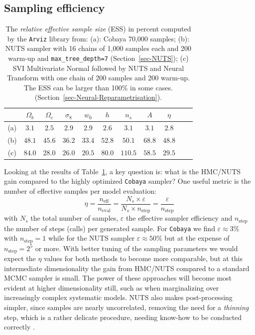 \documentclass[twocolumn,twocolappendix,nofootinbib,iop]{openjournal}
\begin{document}
\subsection{Sampling efficiency}
\label{sec-results}
\begin{table}[htb]
\caption{The \textit{relative effective sample size} (ESS) in percent computed by the \texttt{Arviz} library \citep{arviz_2019} from: 
(a): Cobaya 70,000 samples;
(b): NUTS sampler with 16 chains of 1,000 samples each and 200 warm-up and \texttt{max\_tree\_depth=7} (Section~\ref{sec-NUTS}); 
(c) SVI Multivariate Normal followed by NUTS and Neural Transform  with one chain of 200 samples and 200 warm-up. The ESS can be larger than 100\% in some cases.  (Section~\ref{sec-Neural-Reparametrisation}).}
\label{tab-ESS-NUTS_SVI-1}
 \centering
\begin{tabular}{ccccccccccc}
\hline
    & $\Omega_b$ & $\Omega_c$ & $\sigma_8$ & $w_0$ & $h$ & $n_s$ & $A$ & $\eta$\\
\hline
(a) &  $3.1$ & $2.5$       & $2.9$      & $2.9$  & $2.6$  & $3.1$  & $3.1$ & $2.8$ \\  
(b) & $48.1$ &  $45.6$     & $36.2$     & $33.4$ & $52.8$ & $50.1$ & $68.8$ & $48.8$\\
(c) & $84.0$ &  $28.0$     & $26.0$     & $20.5$ & $80.0$ & $110.5$ & $58.5$ & $29.5$\\
\hline
\end{tabular}
\end{table}
%
Looking at the results of Table~\ref{tab-ESS-NUTS_SVI-1}, a key question is: what is the HMC/NUTS gain compared to the highly optimized \texttt{Cobaya} sampler? 
One useful metric is the number of effective samples per model evaluation:
\begin{equation}
    \eta = \frac{n_\mathrm{eff}}{n_\mathrm{eval}} = \frac{N_s \times \varepsilon}{N_s \times n_\mathrm{step}} = \frac{\varepsilon}{n_\mathrm{step}}
\end{equation}
with $N_s$ the total number of samples, $\varepsilon$ the effective sampler efficiency  and $n_\mathrm{step}$ the number of steps (calls) per generated sample. For \texttt{Cobaya} we find $\varepsilon\approx 3\%$ with $n_\mathrm{step}=1$ while for the NUTS sampler $\varepsilon\approx 50\%$ but at the expense of $n_\mathrm{step}=2^5$ or more. With better tuning of the sampling parameters we would expect the $\eta$ values for both methods to become more comparable, but at this intermediate dimensionality the gain from HMC/NUTS compared to a standard MCMC sampler is small. The power of these approaches will become most evident at higher dimensionality still, such as when marginalizing over increasingly complex systematic models. NUTS also makes post-processing simpler, since samples are nearly uncorrelated, removing the need for a \textit{thinning} step, which is a rather delicate procedure, needing know-how to be conducted correctly \citep{doi:10.1146/annurev-statistics-040220-091727, Owen2017}.
\end{document}
